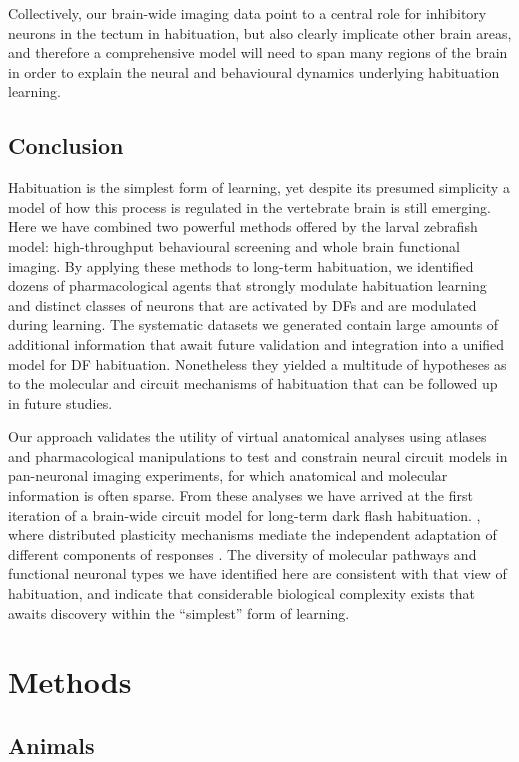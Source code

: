 \documentclass[9pt,lineno]{RandlettLab_elife}
\begin{document}
Collectively, our brain-wide imaging data point to a central role for inhibitory neurons in the tectum in habituation, but also clearly implicate other brain areas, and therefore a comprehensive model will need to span many regions of the brain in order to explain the neural and behavioural dynamics underlying habituation learning. 

\subsection{Conclusion}

Habituation is the simplest form of learning, yet despite its presumed simplicity a model of how this process is regulated in the vertebrate brain is still emerging. Here we have combined two powerful methods offered by the larval zebrafish model: high-throughput behavioural screening and whole brain functional imaging. By applying these methods to long-term habituation, we identified dozens of pharmacological agents that strongly modulate habituation learning and distinct classes of neurons that are activated by DFs and are modulated during learning. The systematic datasets we generated contain large amounts of additional information that await future validation and integration into a unified model for DF habituation. Nonetheless they yielded a multitude of hypotheses as to the molecular and circuit mechanisms of habituation that can be followed up in future studies. 

Our approach validates the utility of virtual anatomical analyses using atlases and pharmacological manipulations to test and constrain neural circuit models in pan-neuronal imaging experiments, for which anatomical and molecular information is often sparse. From these analyses we have arrived at the first iteration of a brain-wide circuit model for long-term dark flash habituation. 
, where distributed plasticity mechanisms mediate the independent adaptation of different components of responses \cite{Randlett2019-fi}. The diversity of molecular pathways and functional neuronal types we have identified here are consistent with that view of habituation, and indicate that considerable biological complexity exists that awaits discovery within the “simplest” form of learning. 


\section{Methods}

\subsection{Animals}
\end{document}
